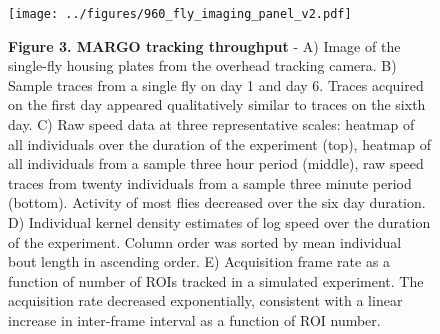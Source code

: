 \documentclass[10pt]{article}
\begin{document}
\newpage
\begin{figure}[h!]
	\begin{center}
		\texttt{[image: ../figures/960\_fly\_imaging\_panel\_v2.pdf]}
	\end{center}
	\caption*{\footnotesize \textbf{Figure 3. MARGO tracking throughput} - A) Image of the single-fly housing plates from the overhead tracking camera. B) Sample traces from a single fly on day 1 and day 6. Traces acquired on the first day appeared qualitatively similar to traces on the sixth day.  C) Raw speed data at three representative scales: heatmap of all individuals over the duration of the experiment (top), heatmap of all individuals from a sample three hour period (middle), raw speed traces from twenty individuals from a sample three minute period (bottom). Activity of most flies decreased over the six day duration. D) Individual kernel density estimates of log speed over the duration of the experiment. Column order was sorted by mean individual bout length in ascending order. E) Acquisition frame rate as a function of number of ROIs tracked in a simulated experiment. The acquisition rate decreased exponentially, consistent with a linear increase in inter-frame interval as a function of ROI number.}
\end{figure}
\end{document}
